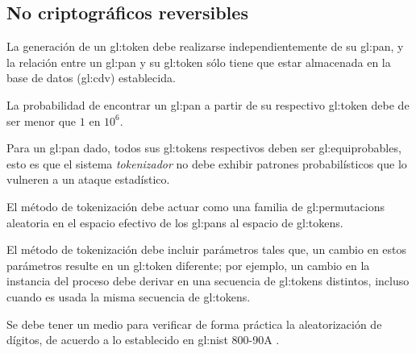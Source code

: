 %
%

\subsection{No criptográficos reversibles}

{
  La generación de un \gls{gl:token} debe realizarse independientemente de
  su \gls{gl:pan}, y la relación entre un \gls{gl:pan} y su \gls{gl:token}
  sólo tiene que estar almacenada en la base de datos (\gls{gl:cdv})
  establecida.
}

{
  La probabilidad de encontrar un \gls{gl:pan} a partir de su respectivo
  \gls{gl:token} debe de ser menor que $1$ en $10^6$.
}

{
  Para un \gls{gl:pan} dado, todos sus \glspl{gl:token} respectivos
  deben ser \glspl{gl:equiprobable}, esto es que el sistema
  \textit{tokenizador} no debe exhibir patrones probabilísticos que
  lo vulneren a un ataque estadístico.
}

{
  El método de tokenización debe actuar como una familia de
  \glspl{gl:permutacion} aleatoria en el espacio efectivo de los
  \glspl{gl:pan} al espacio de \glspl{gl:token}.
}

{
  El método de tokenización debe incluir parámetros tales que, un
  cambio en estos parámetros resulte en un \gls{gl:token} diferente;
  por ejemplo, un cambio en la instancia del proceso debe derivar en
  una secuencia de \glspl{gl:token} distintos, incluso cuando es usada
  la misma secuencia de \glspl{gl:token}.
}


{
  Se debe tener un medio para verificar de forma práctica la aleatorización
  de dígitos, de acuerdo a lo establecido en \gls{gl:nist} 800-90A
  \cite{nist_aleatorios}.
}

